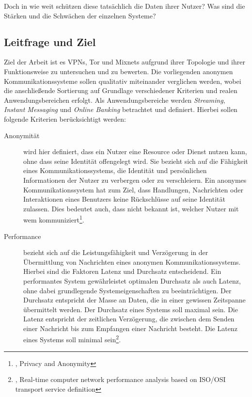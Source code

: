 Doch in wie weit schützen diese tatsächlich die Daten ihrer Nutzer? Was sind die Stärken und die Schwächen der einzelnen Systeme? 

\vfill

\subsection{Leitfrage und Ziel}

Ziel der Arbeit ist es VPNs, Tor und Mixnets aufgrund ihrer Topologie und ihrer Funktionsweise zu untersuchen und zu bewerten. Die vorliegenden anonymen Kommunikationssysteme sollen qualitativ miteinander verglichen werden, wobei die anschließende Sortierung auf Grundlage verschiedener Kriterien und realen Anwendungsbereichen erfolgt. Als Anwendungsbereiche werden \textit{Streaming}, \textit{Instant Messaging} und \textit{Online Banking} betrachtet und definiert. Hierbei sollen folgende Kriterien berücksichtigt werden:

\begin{description}
    \item[Anonymität] wird hier definiert, dass ein Nutzer eine Resource oder Dienst nutzen kann, ohne dass seine Identität offengelegt wird. Sie bezieht sich auf die Fähigkeit eines Kommunikationssystems, die Identität und persönlichen Informationen der Nutzer zu verbergen oder zu verschleiern. Ein anonymes Kommunikationssystem hat zum Ziel, dass Handlungen, Nachrichten oder Interaktionen eines Benutzers keine Rückschlüsse auf seine Identität zulassen. Dies bedeutet auch, dass nicht bekannt ist, welcher Nutzer mit wem kommuniziert\footnote{\cite{DefinitionOfAnonymity}, Privacy and Anonymity}.

    \item[Performance] bezieht sich auf die Leistungsfähigkeit und Verzögerung in der Übermittlung von Nachrichten eines anonymen Kommunikationssystems. Hierbei sind die Faktoren Latenz und Durchsatz entscheidend. Ein performantes System gewährleistet optimalen Durchsatz als auch Latenz, ohne dabei grundlegende Systemeigenschaften zu beeinträchtigen. Der Durchsatz entspricht der Masse an Daten, die in einer gewissen Zeitspanne übermittelt werden. Der Durchsatz eines Systems soll maximal sein. Die Latenz entspricht der zeitlichen Verzögerung, die zwischen dem Senden einer Nachricht bis zum Empfangen einer Nachricht besteht. Die Latenz eines Systems soll minimal sein\footnote{\cite{ComputerNetworkPerformanceAnalysis}, Real-time computer network performance analysis based on ISO/OSI transport service definition}.
\end{description}
